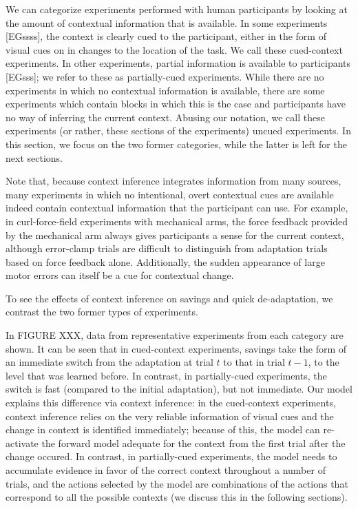 \documentclass[a4paper,doc,floatsintext,natbib]{apa6}
\begin{document}
We can categorize experiments performed with human participants by looking at the amount of contextual information that is available. In some experiments [EGssss], the context is clearly cued to the participant, either in the form of visual cues on in changes to the location of the task. We call these cued-context experiments. In other experiments, partial information is available to participants [EGsss]; we refer to these as partially-cued experiments. While there are no experiments in which no contextual information is available, there are some experiments which contain blocks in which this is the case and participants have no way of inferring the current context. Abusing our notation, we call these experiments (or rather, these sections of the experiments) uncued experiments. In this section, we focus on the two former categories, while the latter is left for the next sections.

Note that, because context inference integrates information from many sources, many experiments in which no intentional, overt contextual cues are available indeed contain contextual information that the participant can use. For example, in curl-force-field experiments with mechanical arms, the force feedback provided by the mechanical arm always gives participants a sense for the current context, although error-clamp trials are difficult to distinguish from adaptation trials based on force feedback alone. Additionally, the sudden appearance of large motor errors can itself be a cue for contextual change.

To see the effects of context inference on savings and quick de-adaptation, we contrast the two former types of experiments.

In FIGURE XXX, data from representative experiments from each category are shown. It can be seen that in cued-context experiments, savings take the form of an immediate switch from the adaptation at trial $t$ to that in trial $t-1$, to the level that was learned before. In contrast, in partially-cued experiments, the switch is fast (compared to the initial adaptation), but not immediate. Our model explains this difference via context inference: in the cued-context experiments, context inference relies on the very reliable information of visual cues and the change in context is identified immediately; because of this, the model can re-activate the forward model adequate for the context from the first trial after the change occured. In contrast, in partially-cued experiments, the model needs to accumulate evidence in favor of the correct context throughout a number of trials, and the actions selected by the model are combinations of the actions that correspond to all the possible contexts (we discuss this in the following sections).
\end{document}
